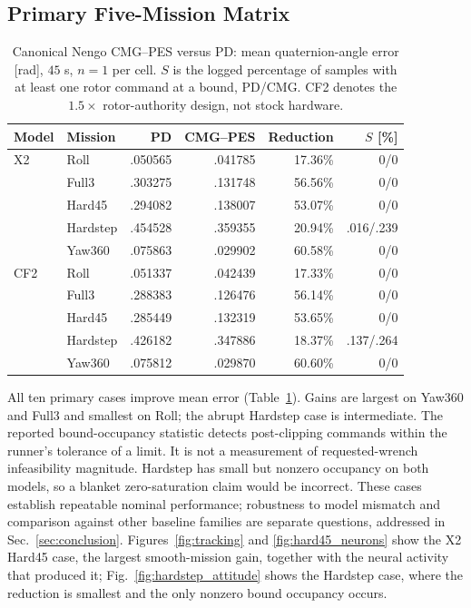 \documentclass[letterpaper,10pt,conference]{IEEEtran}
\begin{document}
\subsection{Primary Five-Mission Matrix}
\begin{table}[t]
\caption{Canonical Nengo CMG--PES versus PD: mean quaternion-angle error
[rad], $45$ s, $n=1$ per cell. $S$ is the logged percentage of samples with
at least one rotor command at a bound, PD/CMG. CF2 denotes the $1.5\times$
rotor-authority design, not stock hardware.}
\label{tab:mujoco}\centering\scriptsize
\setlength{\tabcolsep}{3pt}
\begin{tabular}{llrrrr}
\toprule
Model&Mission&PD&CMG--PES&Reduction&$S$ [\%]\\\midrule
X2&Roll&.050565&.041785&17.36\%&0/0\\
&Full3&.303275&.131748&56.56\%&0/0\\
&Hard45&.294082&.138007&53.07\%&0/0\\
&Hardstep&.454528&.359355&20.94\%&.016/.239\\
&Yaw360&.075863&.029902&60.58\%&0/0\\\midrule
CF2&Roll&.051337&.042439&17.33\%&0/0\\
&Full3&.288383&.126476&56.14\%&0/0\\
&Hard45&.285449&.132319&53.65\%&0/0\\
&Hardstep&.426182&.347886&18.37\%&.137/.264\\
&Yaw360&.075812&.029870&60.60\%&0/0\\\bottomrule
\end{tabular}
\end{table}
All ten primary cases improve mean error (Table~\ref{tab:mujoco}). Gains
are largest on Yaw360 and Full3 and smallest on Roll; the abrupt Hardstep
case is intermediate. The reported bound-occupancy statistic detects
post-clipping commands within the runner's tolerance of a limit. It is not
a measurement of requested-wrench infeasibility magnitude. Hardstep has
small but nonzero occupancy on both models, so a blanket zero-saturation
claim would be incorrect. These cases establish repeatable nominal performance; robustness to model
mismatch and comparison against other baseline families are separate
questions, addressed in Sec.~\ref{sec:conclusion}. Figures~\ref{fig:tracking} and \ref{fig:hard45_neurons} show
the X2 Hard45 case, the largest smooth-mission gain, together with the
neural activity that produced it; Fig.~\ref{fig:hardstep_attitude} shows
the Hardstep case, where the reduction is smallest and the only nonzero
bound occupancy occurs.
\end{document}
